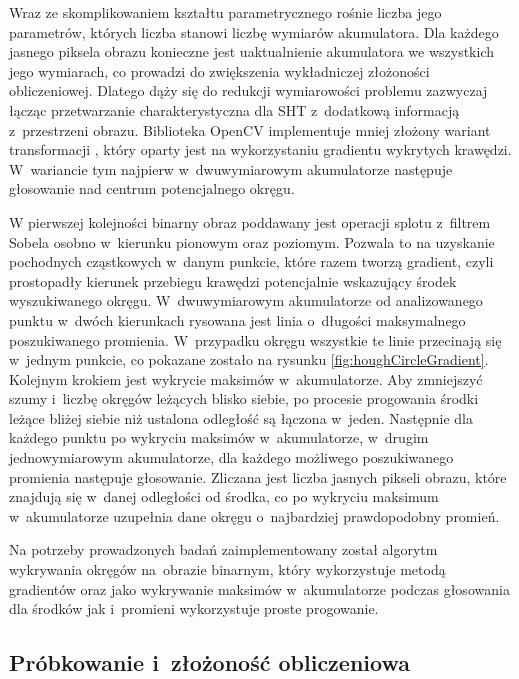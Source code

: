 Wraz ze skomplikowaniem kształtu parametrycznego rośnie liczba jego parametrów, których liczba stanowi liczbę wymiarów akumulatora. Dla każdego jasnego piksela obrazu konieczne jest uaktualnienie akumulatora we wszystkich jego wymiarach, co prowadzi do zwiększenia wykładniczej złożoności obliczeniowej. Dlatego dąży się do redukcji wymiarowości problemu zazwyczaj łącząc przetwarzanie charakterystyczna dla SHT z~dodatkową informacją z~przestrzeni obrazu. Biblioteka OpenCV implementuje mniej złożony wariant transformacji \cite{ito2012detection}, który oparty jest na wykorzystaniu gradientu wykrytych krawędzi. W~wariancie tym najpierw w~dwuwymiarowym akumulatorze następuje głosowanie nad centrum potencjalnego okręgu.

W pierwszej kolejności binarny obraz poddawany jest operacji splotu z~filtrem Sobela osobno w~kierunku pionowym oraz poziomym. Pozwala to na uzyskanie pochodnych cząstkowych w~danym punkcie, które razem tworzą gradient, czyli prostopadły kierunek przebiegu krawędzi potencjalnie wskazujący środek wyszukiwanego okręgu. W~dwuwymiarowym akumulatorze od analizowanego punktu w~dwóch kierunkach rysowana jest linia o~długości maksymalnego poszukiwanego promienia. W~przypadku okręgu wszystkie te linie przecinają się w~jednym punkcie, co pokazane zostało na rysunku \ref{fig:houghCircleGradient}. Kolejnym krokiem jest wykrycie maksimów w~akumulatorze. Aby zmniejszyć szumy i~liczbę okręgów leżących blisko siebie, po procesie progowania środki leżące bliżej siebie niż ustalona odległość są łączona w~jeden. Następnie dla każdego punktu po wykryciu maksimów w~akumulatorze, w~drugim jednowymiarowym akumulatorze, dla każdego możliwego poszukiwanego promienia następuje głosowanie. Zliczana jest liczba jasnych pikseli obrazu, które znajdują się w~danej odległości od środka, co po wykryciu maksimum w~akumulatorze uzupełnia dane okręgu o~najbardziej prawdopodobny promień.

Na potrzeby prowadzonych badań zaimplementowany został algorytm wykrywania okręgów na~obrazie binarnym, który wykorzystuje metodą gradientów oraz jako wykrywanie maksimów w~akumulatorze podczas głosowania dla środków jak i~promieni wykorzystuje proste progowanie.

\subsection{Próbkowanie i~złożoność obliczeniowa}

